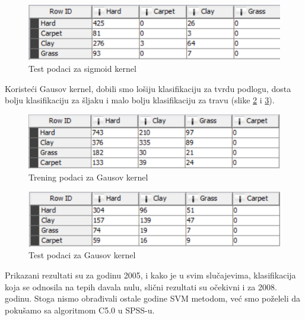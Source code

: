 \documentclass[a4paper]{article}
\begin{document}
\begin{figure}[h!]
	\begin{center}
		\includegraphics[scale=0.80]{KNIME_project/SVM/sigmoid_test}
	\end{center}
	\caption{Test podaci za sigmoid kernel}
	\label{fig:sigmoid_test}
\end{figure}

Koristeći Gausov kernel, dobili smo lošiju klasifikaciju za tvrdu podlogu, dosta bolju klasifikaciju za šljaku
i malo bolju klasifikaciju za travu (slike \ref{fig:rbf_training} i \ref{fig:rbf_test}). \\

\begin{figure}[h!]
	\begin{center}
		\includegraphics[scale=0.80]{KNIME_project/SVM/rbf_training}
	\end{center}
	\caption{Trening podaci za Gausov kernel}
	\label{fig:rbf_training}
\end{figure}

\begin{figure}[h!]
\begin{center}
	\includegraphics[scale=0.80]{KNIME_project/SVM/rbf_test}
\end{center}
\caption{Test podaci za Gausov kernel}
\label{fig:rbf_test}
\end{figure}

Prikazani rezultati su za godinu 2005, i kako je u svim slučajevima, klasifikacija koja se odnosila na tepih davala nulu, slični rezultati su očekivni i za 2008. godinu. Stoga nismo obrađivali ostale godine SVM metodom, već smo poželeli da pokušamo sa algoritmom C5.0 u SPSS-u.
\end{document}
